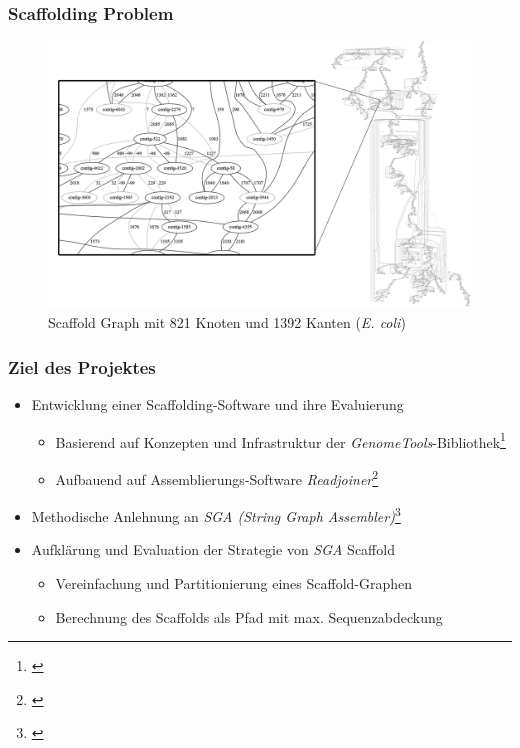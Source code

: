 \documentclass[xcolor=pst]{beamer}
\begin{document}
\begin{frame}
  \frametitle{Scaffolding Problem}
  \begin{center}
    \begin{figure}
      \includegraphics[width=\textwidth,height=0.7\textheight,keepaspectratio]{figures/Scaffolding_graph.png}
      \caption{Scaffold Graph mit 821 Knoten und 1392 Kanten (\textit{E. coli})}
    \end{figure}
  \end{center}
\end{frame}

\begin{frame}
  \frametitle{Ziel des Projektes}
  \begin{itemize}
  \item Entwicklung einer Scaffolding-Software und ihre Evaluierung
  \begin{itemize}
    \item Basierend auf Konzepten und Infrastruktur der \textit{GenomeTools}-Bibliothek\footnote{\cite{Gremme:2013}}
    \item Aufbauend auf Assemblierungs-Software \textit{Readjoiner}\footnote{\cite{Gonnella:2012gn}}
  \end{itemize}
  \item Methodische Anlehnung an \textit{SGA (String Graph Assembler)}\footnote{\cite{Simpson:2012ef}}
  \item Aufklärung und Evaluation der Strategie von \textit{SGA} Scaffold
  \begin{itemize}
    \item Vereinfachung und Partitionierung eines Scaffold-Graphen
    \item Berechnung des Scaffolds als Pfad mit max. Sequenzabdeckung
  \end{itemize}
  \end{itemize}
\end{frame}
\end{document}
